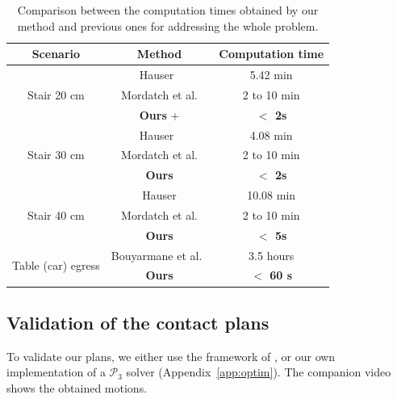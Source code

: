 \begin{table}
\centering
\begin{tabular}{ c | c | c }
 Scenario & Method  & Computation time \\
 \hline
   \multirow{3}{*}{Stair 20 cm} & Hauser~\cite{Hauser06usingmotion} &  5.42 min  \\							 
							  & Mordatch et al.\cite{Mordatch:2012:DCB:2185520.2185539} & 2 to 10 min \\
							 & \textbf{Ours} + \cite{Carpentier2016}  & \textbf{$ <$ 2s} \\
 \hline
   \multirow{3}{*}{Stair 30 cm} & Hauser~\cite{Hauser06usingmotion} &  4.08 min  \\
							 & Mordatch et al.\cite{Mordatch:2012:DCB:2185520.2185539} & 2 to 10 min \\
							 & \textbf{Ours}  & \textbf{$ <$ 2s}   \\
 \hline
   \multirow{3}{*}{Stair 40 cm} & Hauser \cite{Hauser06usingmotion} &  10.08 min  \\
							 & Mordatch et al.\cite{Mordatch:2012:DCB:2185520.2185539} & 2 to 10 min \\
							 & \textbf{Ours}   & \textbf{$ <$ 5s}   \\
 \hline
   \multirow{2}{*}{Table (car) egress} & Bouyarmane et al.~\cite{Bouyarmane2009, DBLP:conf/iser/EscandeKMG08} & 3.5 hours  \\
							 & \textbf{Ours}  & \textbf{$<$ 60 s} \\
							 
 \end{tabular}
\caption{Comparison between the computation times obtained by our method and previous ones for addressing the whole problem.}
\label{tab:compprev}
\quad
\end{table}

\subsection{Validation of the contact plans} \label{sec:valid}
To validate our plans, we either use the framework of \cite{Carpentier2016}, or our own implementation of a $\mathcal{P}_3$ solver (Appendix~\ref{app:optim}).
The companion video shows the obtained motions.

